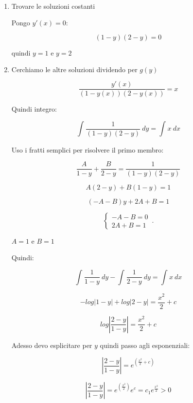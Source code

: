 \documentclass[11pt]{article}
\begin{document}
\begin{enumerate}
    \item Trovare le soluzioni costanti

        Pongo $y'(x) = 0 $:

        \[
            (1-y)(2-y) = 0
        \]

        quindi $y=1$ e $y=2$

    \item Cerchiamo le altre soluzioni dividendo per $g(y)$

        \[
            \frac{y'(x)}{(1-y(x))(2-y(x))} = x
        \]

        Quindi integro:

        \[
            \int_{{}}^{{}} {\frac{1}{(1-y)(2-y)} } \: d{y} {}= \int_{{}}^{{}} {x} \: d{x} {}
        \]

        Uso i fratti semplici per risolvere il primo membro:

        \[
            \frac{A}{1-y} + \frac{B}{2-y} = \frac{1}{(1-y)(2-y)} 
        \]

        \[
            A(2-y)+B(1-y) = 1
        \]

        \[
            (-A -B) y +2A + B = 1
        \]

        \begin{equation}
            \begin{cases}
              -A -B = 0\\
              2A+B= 1
            \end{cases}\,.
        \end{equation}

        $A=1$ e $B=1$
        
        Quindi:

        \[
            \int_{{}}^{{}} {\frac{1}{1-y}} \: d{y} {}- \int_{{}}^{{}} {\frac{1}{2-y} } \: d{y} {} = \int_{{}}^{{}} {x} \: d{x} {}
        \]

        \[
            -log|1-y| + log|2-y| = \frac{x ^{2}}{2} +c
        \]

        \[
            log|\frac{2-y}{1-y} | = \frac{x ^{2}}{2} +c
        \]

        Adesso devo esplicitare per $y$ quindi passo agli esponenziali:

        \[
            |\frac{2-y}{1-y} | = e^{(\frac{x ^{2}}{2} +c)}
        \]

        \[
            |\frac{2-y}{1-y} | = e^{(\frac{x ^{2}}{2})} e ^{c} = c_1 e ^{\frac{x ^{2}}{2} } >0
        \]


\end{enumerate}
\end{document}
